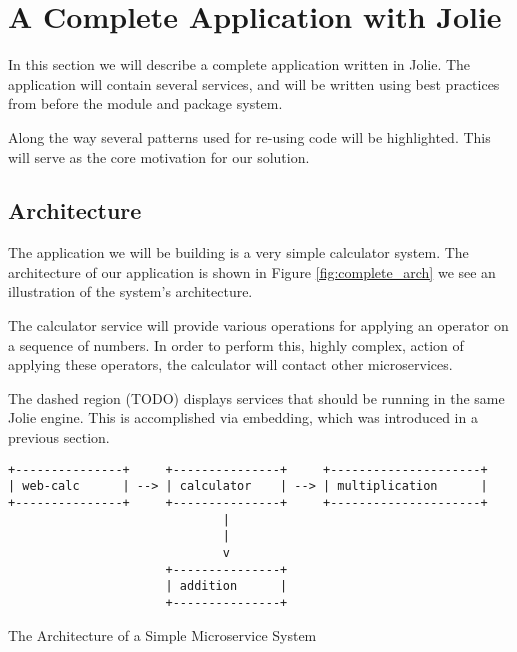 \section{A Complete Application with Jolie}

In this section we will describe a complete application written in Jolie. The
application will contain several services, and will be written using best
practices from before the module and package system.

Along the way several patterns used for re-using code will be highlighted. This
will serve as the core motivation for our solution.

\subsection{Architecture}

%

The application we will be building is a very simple calculator system. The
architecture of our application is shown in Figure \ref{fig:complete_arch} we
see an illustration of the system's architecture.

The calculator service will provide various operations for applying an operator
on a sequence of numbers. In order to perform this, highly complex, action of
applying these operators, the calculator will contact other microservices.

The dashed region (TODO) displays services that should be running in the same
Jolie engine. This is accomplished via embedding, which was introduced in a
previous section.

\begin{listing}[H]
\begin{verbatim}
+---------------+     +---------------+     +---------------------+
| web-calc      | --> | calculator    | --> | multiplication      |
+---------------+     +---------------+     +---------------------+
                              |
                              |
                              v
                      +---------------+
                      | addition      |
                      +---------------+
\end{verbatim}
\caption{The Architecture of a Simple Microservice System}
\label{fig:complete_arch}
\end{listing}

